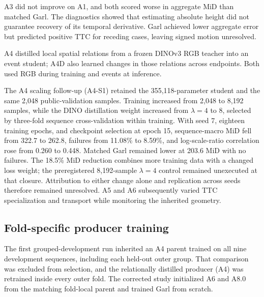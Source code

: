 \begin{table}[htbp]
\centering\small

\caption{Selected early eAP public-validation results for A1, A3, and matched Garl. A0 and the A1 architecture variants described in the text are not tabulated here.}
\label{tab:early-screen}
\end{table}

A3 did not improve on A1, and both scored worse in aggregate MiD than matched Garl. The diagnostics showed that estimating absolute height did not guarantee recovery of its temporal derivative. Garl achieved lower aggregate error but predicted positive TTC for receding cases, leaving signed motion unresolved.

A4 distilled local spatial relations from a frozen DINOv3 RGB teacher into an event student; A4D also learned changes in those relations across endpoints. Both used RGB during training and events at inference. 

The A4 scaling follow-up (A4-S1) retained the 355,118-parameter student and the same 2,048 public-validation samples. Training increased from 2,048 to 8,192 samples, while the DINO distillation weight increased from $\lambda=4$ to $8$, selected by three-fold sequence cross-validation within training. With seed 7, eighteen training epochs, and checkpoint selection at epoch 15, sequence-macro MiD fell from 322.7 to 262.8, failures from 11.08\% to 8.59\%, and log-scale-ratio correlation rose from 0.260 to 0.448. Matched Garl remained lower at 203.6 MiD with no failures. The 18.5\% MiD reduction combines more training data with a changed loss weight; the preregistered 8,192-sample $\lambda=4$ control remained unexecuted at that closure. Attribution to either change alone and replication across seeds therefore remained unresolved. A5 and A6 subsequently varied TTC specialization and transport while monitoring the inherited geometry. 

\subsection{Fold-specific producer training}

The first grouped-development run inherited an A4 parent trained on all nine development sequences, including each held-out outer group. That comparison was excluded from selection, and the relationally distilled producer (A4) was retrained inside every outer fold. The corrected study initialized A6 and A8.0 from the matching fold-local parent and trained Garl from scratch.

